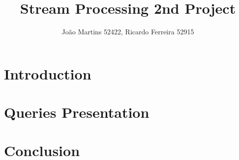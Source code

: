 \documentclass[runningheads]{llncs}
\begin{document}
\title{Stream Processing 2nd Project}
%
%
\author{João Martins 52422, Ricardo Ferreira 52915}

%
\maketitle              %
%
\vspace{-0.6cm}
\begin{abstract}
\end{abstract}

\section{Introduction}


\section{Queries Presentation}


\section{Conclusion}




\end{document}
